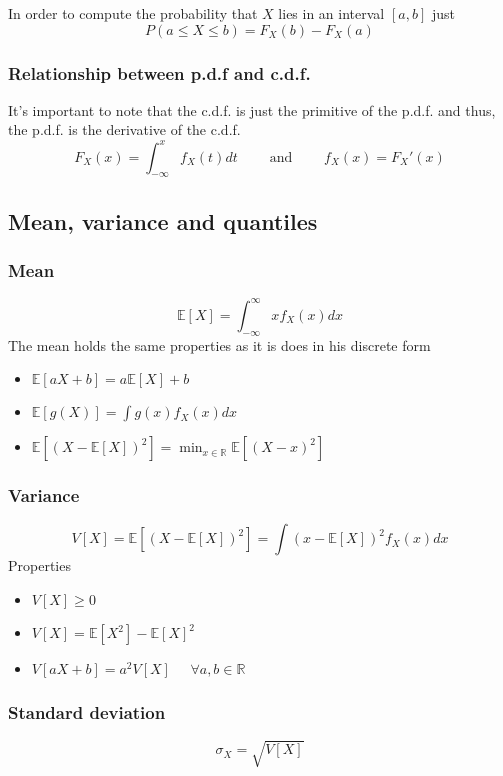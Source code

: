 \begin{tcolorbox}
    In order to compute the probability that $X$ lies in an interval $[a,b]$
    just
    \[ P(a\leq X\leq b) = F_X(b)-F_X(a) \]
\end{tcolorbox}

\subsubsection{Relationship between p.d.f and c.d.f.}
It's important to note that the c.d.f. is just the primitive of the p.d.f. and
thus, the p.d.f. is the derivative of the c.d.f.
\[ F_X(x)=\int_{-\infty}^x f_X(t)dt\;\;\;\;\;\;\;\text{ and }\;\;\;\;\;\;\;
f_X(x) = F_X'(x)  \]

\subsection{Mean, variance and quantiles}
\subsubsection{Mean}
\[ \mathbb{E}[X]  = \int_{-\infty}^\infty xf_X(x)dx\] The mean holds the same
properties as it is does in his discrete form
\begin{itemize}
    \item $\mathbb{E}[aX+b] = a\mathbb{E}[X]+b$
    \item $\mathbb{E}[g(X)] = \int g(x)f_X(x)dx$
    \item $\mathbb{E}[(X-\mathbb{E}[X])^2] = \min_{x\in\mathbb{R}}
    \mathbb{E}[(X-x)^2]$
\end{itemize}

\subsubsection{Variance}
\[ V[X]=\mathbb{E}[(X-\mathbb{E}[X])^2] = \int (x-\mathbb{E}[X])^2 f_X(x)dx \]
Properties
\begin{itemize}
    \item $V[X]\geq 0$
    \item $V[X]=\mathbb{E}[X^2]-\mathbb{E}[X]^2$
    \item $V[aX+b] = a^2V[X]\;\;\;\;\; \forall a,b \in \mathbb{R}$
\end{itemize}

\subsubsection{Standard deviation}
\[ \sigma_X = \sqrt{V[X]} \]

